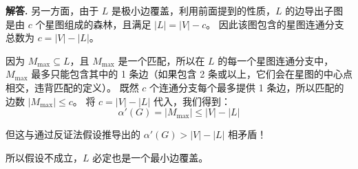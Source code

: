 \documentclass[12pt, a4paper, oneside]{ctexart}
\newenvironment{solution}{\par\noindent\textbf{解答. }}{\par}
\begin{document}
\begin{solution}
     另一方面，由于 $L$ 是极小边覆盖，利用前面提到的性质，$L$ 的边导出子图是由 $c$ 个星图组成的森林，且满足 $|L| = |V| - c$。
     因此该图包含的星图连通分支总数为 $c = |V| - |L|$。
     
    因为 $M_{\text{max}} \subseteq L$，且 $M_{\text{max}}$ 是一个匹配，所以在 $L$ 的每一个星图连通分支中，$M_{\text{max}}$ 最多只能包含其中的 1 条边（如果包含 2 条或以上，它们会在星图的中心点相交，违背匹配的定义）。
    既然 $c$ 个连通分支每个最多提供 1 条边，所以匹配的边数 $|M_{\text{max}}| \le c$。
     将 $c = |V| - |L|$ 代入，我们得到：
     \[ \alpha'(G) = |M_{\text{max}}| \le |V| - |L| \]
     
    但这与通过反证法假设推导出的 $\alpha'(G) > |V| - |L|$ 相矛盾！
     
     所以假设不成立，$L$ 必定也是一个最小边覆盖。

\end{solution}
\end{document}
